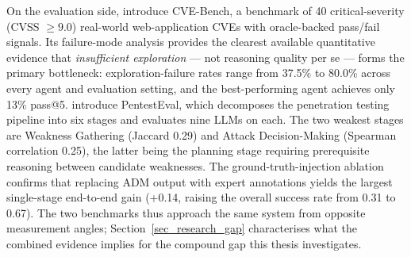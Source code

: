 On the evaluation side, \citet{zhu2025cvebench} introduce CVE-Bench, a benchmark of 40 critical-severity (CVSS $\geq 9.0$) real-world web-application CVEs with oracle-backed pass/fail signals. Its failure-mode analysis provides the clearest available quantitative evidence that \emph{insufficient exploration} --- not reasoning quality per se --- forms the primary bottleneck: exploration-failure rates range from 37.5\% to 80.0\% across every agent and evaluation setting, and the best-performing agent achieves only 13\% pass@5. \citet{yang2025pentesteval} introduce PentestEval, which decomposes the penetration testing pipeline into six stages and evaluates nine LLMs on each. The two weakest stages are Weakness Gathering (Jaccard 0.29) and Attack Decision-Making (Spearman correlation 0.25), the latter being the planning stage requiring prerequisite reasoning between candidate weaknesses. The ground-truth-injection ablation confirms that replacing ADM output with expert annotations yields the largest single-stage end-to-end gain (+0.14, raising the overall success rate from 0.31 to 0.67). The two benchmarks thus approach the same system from opposite measurement angles; Section~\ref{sec_research_gap} characterises what the combined evidence implies for the compound gap this thesis investigates.
